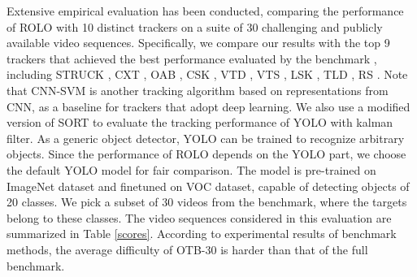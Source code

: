 \documentclass{article}
\begin{document}

Extensive empirical evaluation has been conducted, comparing the performance of ROLO with 10 distinct trackers on a suite of 30 challenging and publicly available video sequences.
Specifically, we compare our results with the top 9 trackers that achieved the best performance evaluated by the benchmark \citep{wu2015object}, including STRUCK \citep{7360205}, CXT \citep{dinh2011context}, OAB \citep{grabner2006real}, CSK \citep{henriques2012exploiting}, VTD \citep{kwon2010visual}, VTS \citep{kwon2011tracking}, LSK \citep{liu2011robust}, TLD \citep{kalal2010pn}, RS \citep{collins2005online}.
Note that CNN-SVM \citep{hong2015tracking} is another tracking algorithm based on representations from CNN, as a baseline for trackers that adopt deep learning.
We also use a modified version of SORT \citep{bewley2015sort} to evaluate the tracking performance of YOLO with kalman filter.
As a generic object detector, YOLO can be trained to recognize arbitrary objects.
Since the performance of ROLO depends on the YOLO part,
we choose the default YOLO model for fair comparison. The model is pre-trained on ImageNet dataset and finetuned on VOC dataset,
capable of detecting objects of 20 classes.
We pick a subset of 30 videos from the benchmark, where the targets belong to these classes.
The video sequences considered in this evaluation are summarized in Table \ref{scores}. According to experimental results of benchmark methods, the average difficulty of OTB-30 is harder than that of the full benchmark.


\end{document}
